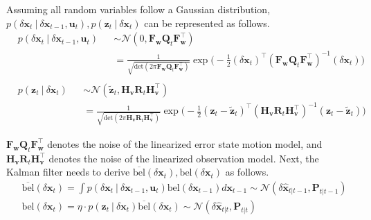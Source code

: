 \documentclass[10pt]{article}
\begin{document}
	
	Assuming all random variables follow a Gaussian distribution, $p(\delta \mathbf{x}_{t} \ | \ \delta \mathbf{x}_{t-1}, \mathbf{u}_{t}), p(\mathbf{z}_{t} \ | \ \delta \mathbf{x}_{t})$ can be represented as follows. 
	\begin{equation}
	\begin{aligned}
		& p(\delta \mathbf{x}_{t} \ | \ \delta \mathbf{x}_{t-1}, \mathbf{u}_{t}) && \sim \mathcal{N}(0, \mathbf{F}_{\mathbf{w}}\mathbf{Q}_{t} \mathbf{F}_{\mathbf{w}}^{\intercal} ) \\
		& && = \frac{1}{ \sqrt{\text{det}(2\pi \mathbf{F}_{\mathbf{w}}\mathbf{Q}_{t} \mathbf{F}_{\mathbf{w}}^{\intercal} )}}\exp\bigg( -\frac{1}{2}(\delta \mathbf{x}_{t} )^{\intercal} (\mathbf{F}_{\mathbf{w}}\mathbf{Q}_{t} \mathbf{F}_{\mathbf{w}}^{\intercal})^{-1}(\delta \mathbf{x}_{t} ) \bigg)\\ 
	\end{aligned}
	\end{equation}
	\begin{equation} \label{eq:eskf2}
	\begin{aligned}
		& p(\mathbf{z}_{t} \ | \ \delta \mathbf{x}_{t})  && \sim \mathcal{N}( \tilde{\mathbf{z}}_{t}, \mathbf{H}_{\mathbf{v}}\mathbf{R}_{t}\mathbf{H}_{\mathbf{v}}^{\intercal}) \\
		& && = \frac{1}{ \sqrt{\text{det}(2\pi \mathbf{H}_{\mathbf{v}}\mathbf{R}_{t}\mathbf{H}_{\mathbf{v}}^{\intercal})}}\exp\bigg( -\frac{1}{2}(\mathbf{z}_{t} - \tilde{\mathbf{z}}_{t})^{\intercal} (\mathbf{H}_{\mathbf{v}}\mathbf{R}_{t}\mathbf{H}_{\mathbf{v}}^{\intercal})^{-1}(\mathbf{z}_{t} - \tilde{\mathbf{z}}_{t}) \bigg)
	\end{aligned}
	\end{equation}
	
	$\mathbf{F}_{\mathbf{w}}\mathbf{Q}_{t} \mathbf{F}_{\mathbf{w}}^{\intercal}$ denotes the noise of the linearized error state motion model, and $\mathbf{H}_{\mathbf{v}}\mathbf{R}_{t}\mathbf{H}_{\mathbf{v}}^{\intercal}$ denotes the noise of the linearized observation model. Next, the Kalman filter needs to derive $\overline{\text{bel}}(\delta \mathbf{x}_{t}), \text{bel}(\delta \mathbf{x}_{t})$ as follows.
	\begin{equation}
	\begin{aligned}
		& \overline{\text{bel}}(\delta \mathbf{x}_{t}) = \int p(\delta \mathbf{x}_{t} \ | \ \delta \mathbf{x}_{t-1}, \mathbf{u}_{t})\text{bel}(\delta \mathbf{x}_{t-1}) d \mathbf{x}_{t-1}  \sim \mathcal{N}(\delta \hat{\mathbf{x}}_{t|t-1}, \mathbf{P}_{t|t-1}) \\
		& \text{bel}(\delta \mathbf{x}_{t}) = \eta \cdot p( \mathbf{z}_{t} \ | \  \delta \mathbf{x}_{t})\overline{\text{bel}}(\delta \mathbf{x}_{t}) \sim \mathcal{N}(\delta \hat{\mathbf{x}}_{t|t}, \mathbf{P}_{t|t})
	\end{aligned}
	\end{equation}
	
\end{document}
